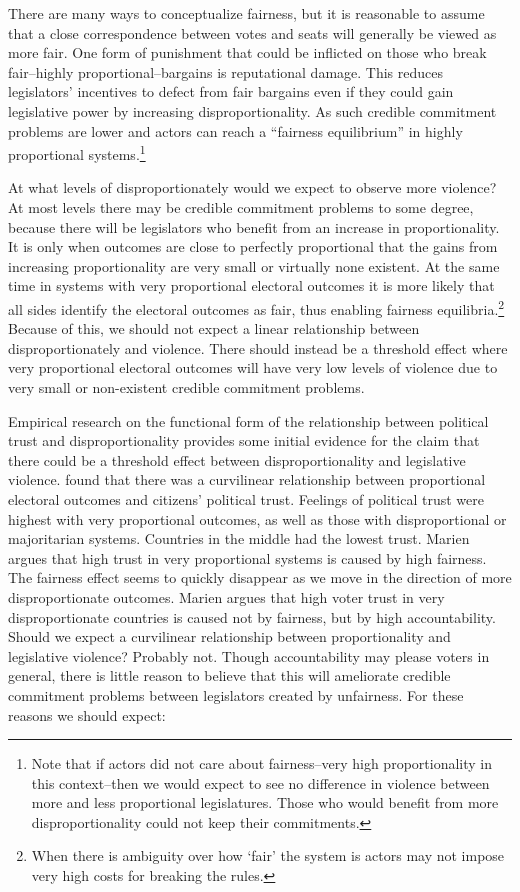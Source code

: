 \documentclass[a4paper]{article}\usepackage[]{graphicx}\usepackage[]{color}
\begin{document}
There are many ways to conceptualize fairness, but it is reasonable to assume that a close correspondence between votes and seats will generally be viewed as more fair. One form of punishment that could be inflicted on those who break fair--highly proportional--bargains is reputational damage. This reduces legislators' incentives to defect from fair bargains even if they could gain legislative power by increasing disproportionality. As such credible commitment problems are lower and actors can reach a ``fairness equilibrium'' in highly proportional systems.\footnote{Note that if actors did not care about fairness--very high proportionality in this context--then we would expect to see no difference in violence between more and less proportional legislatures. Those who would benefit from more disproportionality could not keep their commitments.}

At what levels of disproportionately would we expect to observe more violence? At most levels there may be credible commitment problems to some degree, because there will be legislators who benefit from an increase in proportionality. It is only when outcomes are close to perfectly proportional that the gains from increasing proportionality are very small or virtually none existent. At the same time in systems with very proportional electoral outcomes it is more likely that all sides identify the electoral outcomes as fair, thus enabling fairness equilibria.\footnote{When there is ambiguity over how `fair' the system is actors may not impose very high costs for breaking the rules.} Because of this, we should not expect a linear relationship between disproportionately and violence. There should instead be a threshold effect where very proportional electoral outcomes will have very low levels of violence due to very small or non-existent credible commitment problems.

Empirical research on the functional form of the relationship between political trust and disproportionality provides some initial evidence for the claim that there could be a threshold effect between disproportionality and legislative violence. \cite{Marien2011} found that there was a curvilinear relationship between proportional electoral outcomes and citizens' political trust. Feelings of political trust were highest with very proportional outcomes, as well as those with disproportional or majoritarian systems. Countries in the middle had the lowest trust. Marien argues that high trust in very proportional systems is caused by high fairness. The fairness effect seems to quickly disappear as we move in the direction of more disproportionate outcomes. Marien argues that high voter trust in very disproportionate countries is caused not by fairness, but by high accountability. Should we expect a curvilinear relationship between proportionality and legislative violence? Probably not. Though accountability may please voters in general, there is little reason to believe that this will ameliorate credible commitment problems between legislators created by unfairness. For these reasons we should expect:
\end{document}
